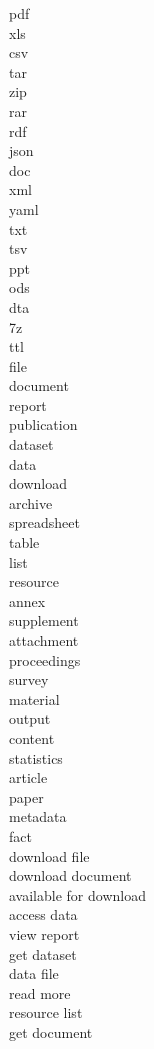 pdf\\
xls\\
csv\\
tar\\
zip\\
rar\\
rdf\\
json\\
doc\\
xml\\
yaml\\
txt\\
tsv\\
ppt\\
ods\\
dta\\
7z\\
ttl\\
file\\
document\\
report\\
publication\\
dataset\\
data\\
download\\
archive\\
spreadsheet\\
table\\
list\\
resource\\
annex\\
supplement\\
attachment\\
proceedings\\
survey\\
material\\
output\\
content\\
statistics\\
article\\
paper\\
metadata\\
fact\\
download file\\
download document\\
available for download\\
access data\\
view report\\
get dataset\\
data file\\
read more\\
resource list\\
get document\\
